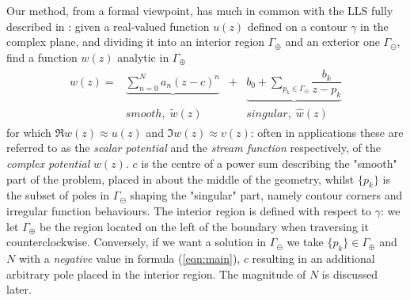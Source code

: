 \documentclass[final,a4paper,onecolumn,3p]{elsarticle}
\begin{document}
Our method, from a formal viewpoint, has much in common with the LLS fully described in \cite{GT19b}: given a real-valued function $u(z)$ defined on a contour $\gamma$ in the complex plane, and dividing it into an interior region $\Gamma_\oplus$ and an exterior one $\Gamma_\ominus$, find a function $w(z)$ analytic in $\Gamma_\oplus$
\begin{align}
	\begin{matrix}
		w(z) = & \underbrace{\sum_{n=0}^{N} a_n(z-c)^n} & + & \underbrace{b_0 + \sum_{p_k\in\Gamma_\ominus}\dfrac{b_k}{z-p_k}} \\
		& smooth,\;\tilde{w}(z) & & singular,\;\hat{w}(z)
	\end{matrix}
	\label{eqn:main}
\end{align}
for which $\Re w(z)\approx u(z)$ and $\Im w(z)\approx v(z)$: often in applications these are referred to as the \emph{scalar potential} and the \emph{stream function} respectively, of the \emph{complex potential} $w(z)$. $c$ is the centre of a power sum describing the "smooth" part of the problem, placed in about the middle of the geometry, whilst $\{p_k\}$ is the subset of poles in $\Gamma_\ominus$ shaping the "singular" part, namely contour corners and irregular function behaviours. The interior region is defined with respect to $\gamma$: we let $\Gamma_\oplus$ be the region located on the left of the boundary when traversing it counterclockwise. Conversely, if we want a solution in $\Gamma_\ominus$ we take $\{p_k\}\in\Gamma_\oplus$ and $N$ with a \emph{negative} value in formula (\ref{eqn:main}), $c$ resulting in an additional arbitrary pole placed in the interior region. The magnitude of $N$ is discussed later.
\end{document}
